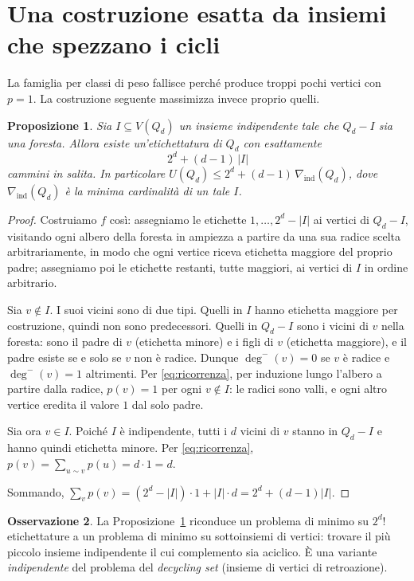 \documentclass[11pt,a4paper]{article}
\theoremstyle{plain}
\newtheorem{proposition}{Proposizione}
\theoremstyle{definition}
\newtheorem{remark}[proposition]{Osservazione}
\newcommand{\Qd}{Q_d}
\begin{document}
\section{Una costruzione esatta da insiemi che spezzano i cicli}

La famiglia per classi di peso fallisce perché produce troppi pochi vertici con
$p=1$. La costruzione seguente massimizza invece proprio quelli.

\begin{proposition}\label{prop:costruzione}
Sia $I\subseteq V(\Qd)$ un insieme \emph{indipendente} tale che $\Qd-I$ sia una
\emph{foresta}. Allora esiste un'etichettatura di $\Qd$ con esattamente
\[
2^d+(d-1)\,|I|
\]
cammini in salita. In particolare
$U(\Qd)\le 2^d+(d-1)\,\nabla_{\mathrm{ind}}(\Qd)$, dove
$\nabla_{\mathrm{ind}}(\Qd)$ è la minima cardinalità di un tale $I$.
\end{proposition}

\begin{proof}
Costruiamo $f$ così: assegniamo le etichette $1,\dots,2^d-|I|$ ai vertici di
$\Qd-I$, visitando ogni albero della foresta in ampiezza a partire da una sua
radice scelta arbitrariamente, in modo che ogni vertice riceva etichetta maggiore
del proprio padre; assegniamo poi le etichette restanti, tutte maggiori, ai
vertici di $I$ in ordine arbitrario.

Sia $v\notin I$. I suoi vicini sono di due tipi. Quelli in $I$ hanno etichetta
maggiore per costruzione, quindi non sono predecessori. Quelli in $\Qd-I$ sono i
vicini di $v$ nella foresta: sono il padre di $v$ (etichetta minore) e i figli di
$v$ (etichetta maggiore), e il padre esiste se e solo se $v$ non è radice.
Dunque $\deg^-(v)=0$ se $v$ è radice e $\deg^-(v)=1$ altrimenti. Per
\eqref{eq:ricorrenza}, per induzione lungo l'albero a partire dalla radice,
$p(v)=1$ per ogni $v\notin I$: le radici sono valli, e ogni altro vertice eredita
il valore $1$ dal solo padre.

Sia ora $v\in I$. Poiché $I$ è indipendente, tutti i $d$ vicini di $v$ stanno in
$\Qd-I$ e hanno quindi etichetta minore. Per \eqref{eq:ricorrenza},
$p(v)=\sum_{u\sim v}p(u)=d\cdot 1=d$.

Sommando, $\sum_v p(v)=(2^d-|I|)\cdot 1+|I|\cdot d=2^d+(d-1)|I|$.
\end{proof}

\begin{remark}
La Proposizione~\ref{prop:costruzione} riconduce un problema di minimo su $2^d!$
etichettature a un problema di minimo su sottoinsiemi di vertici: trovare il più
piccolo insieme indipendente il cui complemento sia aciclico. È una variante
\emph{indipendente} del problema del \emph{decycling set} (insieme di vertici di
retroazione).
\end{remark}
\end{document}
